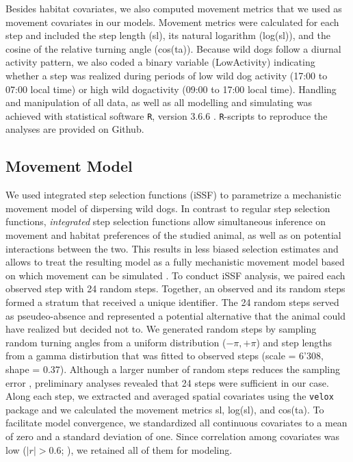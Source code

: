 \documentclass[abstract=on,10pt,a4paper,bibliography=totocnumbered]{article}
\begin{document}
Besides habitat covariates, we also computed movement metrics that we used as
movement covariates in our models. Movement metrics were calculated for each
step and included the step length (\textsf{sl}), its natural logarithm
(\textsf{log(sl)}), and the cosine of the relative turning angle
(\textsf{cos(ta)}). Because wild dogs follow a diurnal activity pattern, we also
coded a binary variable (\textsf{LowActivity}) indicating whether a step was
realized during periods of low wild dog activity (17:00 to 07:00 local time) or
high wild dogactivity (09:00 to 17:00 local time). Handling and manipulation of
all data, as well as all modelling and simulating was achieved with statistical
software {\tt R}, version 3.6.6 \citep{R.2019}. {\tt R}-scripts to reproduce the
analyses are provided on Github.

\subsection{Movement Model}
We used integrated step selection functions (iSSF) to parametrize a mechanistic
movement model of dispersing wild dogs. In contrast to regular step selection
functions, \textit{integrated} step selection functions allow simultaneous
inference on movement and habitat preferences of the studied animal, as well as
on potential interactions between the two. This results in less biased selection
estimates and allows to treat the resulting model as a fully mechanistic
movement model based on which movement can be simulated \citep{Avgar.2016}. To
conduct iSSF analysis, we paired each observed step with 24 random steps.
Together, an observed and its random steps formed a stratum that received a
unique identifier. The 24 random steps served as pseudeo-absence and represented
a potential alternative that the animal could have realized but decided not to.
We generated random steps by sampling random turning angles from a uniform
distribution (\(-\pi, +\pi\)) and step lengths from a gamma distirbution that
was fitted to observed steps (scale = 6'308, shape = 0.37). Although a larger
number of random steps reduces the sampling error \citep{Avgar.2016},
preliminary analyses revealed that 24 steps were sufficient in our case. Along
each step, we extracted and averaged spatial covariates using the {\tt velox}
package and we calculated the movement metrics \textsf{sl}, \textsf{log(sl)},
and \textsf{cos(ta)}. To facilitate model convergence, we standardized all
continuous covariates to a mean of zero and a standard deviation of one. Since
correlation among covariates was low (\(|r| > 0.6\); \citealp{Latham.2011}), we
retained all of them for modeling.
\end{document}

